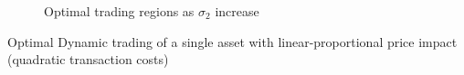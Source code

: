 \documentclass[10pt]{article}
\newenvironment{exercise}[2][Exercise]{\begin{trivlist}
  \item[\hskip \labelsep {\bfseries #1}\hskip \labelsep {\bfseries #2.}]}{\end{trivlist}}
\begin{document}
\begin{figure}[h]
    \centering
    \caption{Optimal trading regions as $\sigma_2$ increase}
    \label{ex2_3}   
\end{figure}

\newpage

\begin{exercise}{3}{Optimal Dynamic trading of a single asset with linear-proportional price impact (quadratic transaction costs)}
\end{exercise}
   
\end{document}

